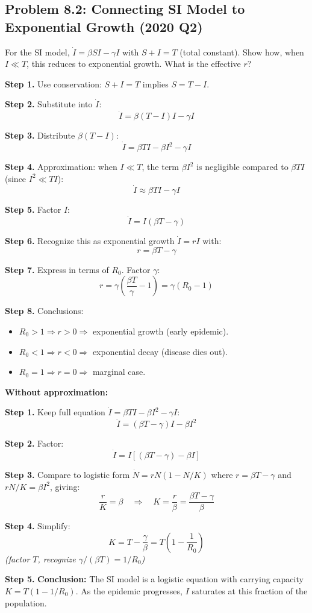 \documentclass[10pt]{article}
\newcommand{\thus}{\quad\Longrightarrow\quad}
\newcommand{\stepwhy}[1]{\textcolor{blue!60!black}{\small\textit{(#1)}}}
\begin{document}
\subsection{Problem 8.2: Connecting SI Model to Exponential Growth (2020 Q2)}

\begin{problem}
For the SI model, $\dot I = \beta S I - \gamma I$ with $S + I = T$ (total constant). Show how, when $I \ll T$, this reduces to exponential growth. What is the effective $r$?
\end{problem}

\begin{solution}
\textbf{Step 1.} Use conservation: $S + I = T$ implies $S = T - I$.

\textbf{Step 2.} Substitute into $\dot I$:
\[
\dot I = \beta(T - I)I - \gamma I
\]

\textbf{Step 3.} Distribute $\beta(T-I)$:
\[
\dot I = \beta TI - \beta I^2 - \gamma I
\]

\textbf{Step 4.} Approximation: when $I \ll T$, the term $\beta I^2$ is negligible compared to $\beta TI$ (since $I^2 \ll TI$):
\[
\dot I \approx \beta TI - \gamma I
\]

\textbf{Step 5.} Factor $I$:
\[
\dot I = I(\beta T - \gamma)
\]

\textbf{Step 6.} Recognize this as exponential growth $\dot I = rI$ with:
\[
\boxed{r = \beta T - \gamma}
\]

\textbf{Step 7.} Express in terms of $R_0$. Factor $\gamma$:
\[
r = \gamma\left(\frac{\beta T}{\gamma} - 1\right) = \gamma(R_0 - 1)
\]

\textbf{Step 8.} Conclusions:
\begin{itemize}
\item $R_0 > 1 \Rightarrow r > 0 \Rightarrow$ exponential growth (early epidemic).
\item $R_0 < 1 \Rightarrow r < 0 \Rightarrow$ exponential decay (disease dies out).
\item $R_0 = 1 \Rightarrow r = 0 \Rightarrow$ marginal case.
\end{itemize}

\medskip\textbf{Without approximation:}

\textbf{Step 1.} Keep full equation $\dot I = \beta TI - \beta I^2 - \gamma I$:
\[
\dot I = (\beta T - \gamma)I - \beta I^2
\]

\textbf{Step 2.} Factor:
\[
\dot I = I[(\beta T - \gamma) - \beta I]
\]

\textbf{Step 3.} Compare to logistic form $\dot N = rN(1 - N/K)$ where $r = \beta T - \gamma$ and $rN/K = \beta I^2$, giving:
\[
\frac{r}{K} = \beta \thus K = \frac{r}{\beta} = \frac{\beta T - \gamma}{\beta}
\]

\textbf{Step 4.} Simplify:
\[
K = T - \frac{\gamma}{\beta} = T\left(1 - \frac{1}{R_0}\right)
\]
\stepwhy{factor $T$, recognize $\gamma/(\beta T) = 1/R_0$}

\textbf{Step 5.} \textbf{Conclusion:} The SI model is a logistic equation with carrying capacity $K = T(1-1/R_0)$. As the epidemic progresses, $I$ saturates at this fraction of the population.
\end{solution}
\end{document}
